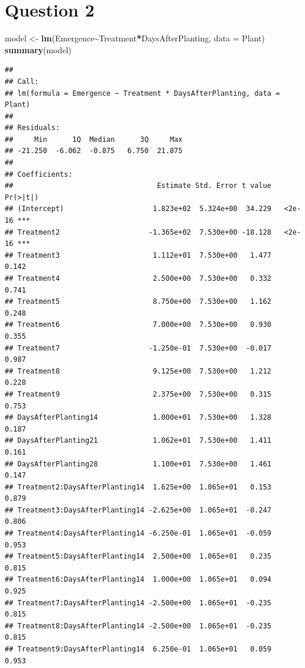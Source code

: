 \documentclass[
]{article}
\newenvironment{Shaded}{\begin{snugshade}}{\end{snugshade}}
\newcommand{\AttributeTok}[1]{\textcolor[rgb]{0.13,0.29,0.53}{#1}}
\newcommand{\FunctionTok}[1]{\textcolor[rgb]{0.13,0.29,0.53}{\textbf{#1}}}
\newcommand{\NormalTok}[1]{#1}
\newcommand{\OtherTok}[1]{\textcolor[rgb]{0.56,0.35,0.01}{#1}}
\newcommand{\SpecialCharTok}[1]{\textcolor[rgb]{0.81,0.36,0.00}{\textbf{#1}}}
\begin{document}
\section{Question 2}\label{question-2}

\begin{Shaded}
\begin{Highlighting}[]
\NormalTok{model }\OtherTok{\textless{}{-}} \FunctionTok{lm}\NormalTok{(Emergence}\SpecialCharTok{\textasciitilde{}}\NormalTok{Treatment}\SpecialCharTok{*}\NormalTok{DaysAfterPlanting, }\AttributeTok{data =}\NormalTok{ Plant)}
\FunctionTok{summary}\NormalTok{(model)}
\end{Highlighting}
\end{Shaded}

\begin{verbatim}
## 
## Call:
## lm(formula = Emergence ~ Treatment * DaysAfterPlanting, data = Plant)
## 
## Residuals:
##     Min      1Q  Median      3Q     Max 
## -21.250  -6.062  -0.875   6.750  21.875 
## 
## Coefficients:
##                                  Estimate Std. Error t value Pr(>|t|)    
## (Intercept)                     1.823e+02  5.324e+00  34.229   <2e-16 ***
## Treatment2                     -1.365e+02  7.530e+00 -18.128   <2e-16 ***
## Treatment3                      1.112e+01  7.530e+00   1.477    0.142    
## Treatment4                      2.500e+00  7.530e+00   0.332    0.741    
## Treatment5                      8.750e+00  7.530e+00   1.162    0.248    
## Treatment6                      7.000e+00  7.530e+00   0.930    0.355    
## Treatment7                     -1.250e-01  7.530e+00  -0.017    0.987    
## Treatment8                      9.125e+00  7.530e+00   1.212    0.228    
## Treatment9                      2.375e+00  7.530e+00   0.315    0.753    
## DaysAfterPlanting14             1.000e+01  7.530e+00   1.328    0.187    
## DaysAfterPlanting21             1.062e+01  7.530e+00   1.411    0.161    
## DaysAfterPlanting28             1.100e+01  7.530e+00   1.461    0.147    
## Treatment2:DaysAfterPlanting14  1.625e+00  1.065e+01   0.153    0.879    
## Treatment3:DaysAfterPlanting14 -2.625e+00  1.065e+01  -0.247    0.806    
## Treatment4:DaysAfterPlanting14 -6.250e-01  1.065e+01  -0.059    0.953    
## Treatment5:DaysAfterPlanting14  2.500e+00  1.065e+01   0.235    0.815    
## Treatment6:DaysAfterPlanting14  1.000e+00  1.065e+01   0.094    0.925    
## Treatment7:DaysAfterPlanting14 -2.500e+00  1.065e+01  -0.235    0.815    
## Treatment8:DaysAfterPlanting14 -2.500e+00  1.065e+01  -0.235    0.815    
## Treatment9:DaysAfterPlanting14  6.250e-01  1.065e+01   0.059    0.953    

\end{verbatim}
\end{document}
